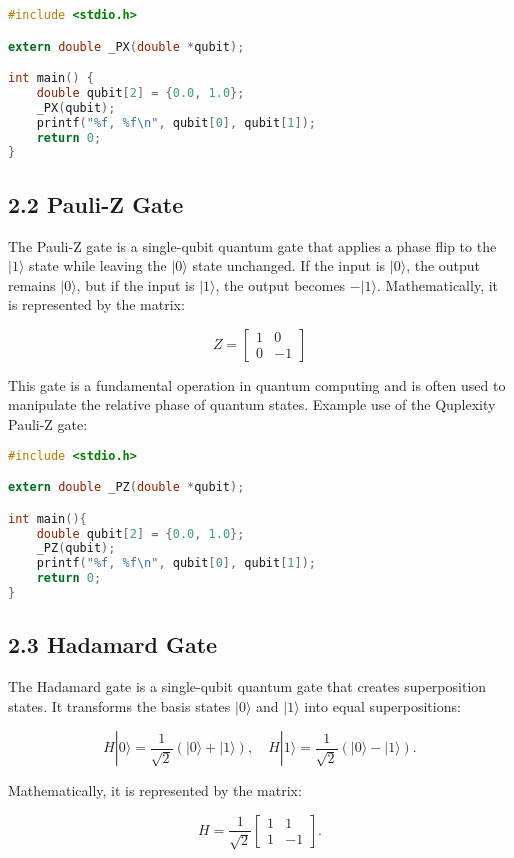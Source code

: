 \documentclass{article}
\begin{document}
\begin{lstlisting}[language=C, frame=single]
#include <stdio.h>

extern double _PX(double *qubit);

int main() {
    double qubit[2] = {0.0, 1.0};
    _PX(qubit);
    printf("%f, %f\n", qubit[0], qubit[1]);
    return 0;
}
\end{lstlisting}

\subsection*{2.2 Pauli-Z Gate}
The Pauli-Z gate is a single-qubit quantum gate that applies a phase flip to the \(|1\rangle\) state while leaving the \(|0\rangle\) state unchanged. If the input is \(|0\rangle\), the output remains \(|0\rangle\), but if the input is \(|1\rangle\), the output becomes \(-|1\rangle\). Mathematically, it is represented by the matrix:

\[
Z = \begin{bmatrix}
1 & 0 \\
0 & -1
\end{bmatrix}
\]

This gate is a fundamental operation in quantum computing and is often used to manipulate the relative phase of quantum states.
Example use of the Quplexity Pauli-Z gate:

\begin{lstlisting}[language=C, frame=single]
#include <stdio.h>

extern double _PZ(double *qubit);

int main(){
    double qubit[2] = {0.0, 1.0};
    _PZ(qubit);
    printf("%f, %f\n", qubit[0], qubit[1]);
    return 0;
}
\end{lstlisting}

\subsection*{2.3 Hadamard Gate}
The Hadamard gate is a single-qubit quantum gate that creates superposition states. It transforms the basis states \(|0\rangle\) and \(|1\rangle\) into equal superpositions:

\[
H|0\rangle = \frac{1}{\sqrt{2}}(|0\rangle + |1\rangle), \quad H|1\rangle = \frac{1}{\sqrt{2}}(|0\rangle - |1\rangle).
\]

Mathematically, it is represented by the matrix:

\[
H = \frac{1}{\sqrt{2}} \begin{bmatrix}
1 & 1 \\
1 & -1
\end{bmatrix}.
\]
\end{document}
